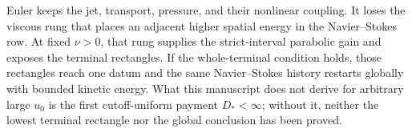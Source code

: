 Euler keeps the jet, transport, pressure, and their nonlinear coupling.  It
loses the viscous rung that places an adjacent higher spatial energy in the
Navier--Stokes row.  At fixed \(\nu>0\), that rung supplies the strict-interval
parabolic gain and exposes the terminal rectangles.  If the whole-terminal
condition holds, those rectangles reach one datum and the same Navier--Stokes
history restarts globally with bounded kinetic energy.  What this manuscript
does not derive for arbitrary large \(u_0\) is the first cutoff-uniform payment
\(D_*<\infty\); without it, neither the lowest terminal rectangle nor the
global conclusion has been proved.
